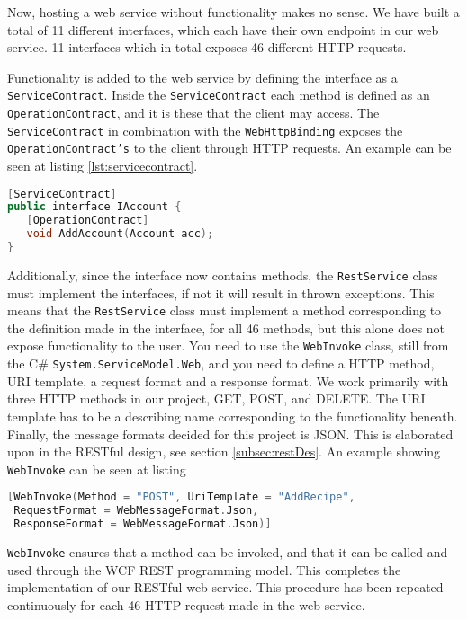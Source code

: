 Now, hosting a web service without functionality makes no sense. We have built a total of 11 different interfaces, which each have their own endpoint in our web service. 11 interfaces which in total exposes 46 different HTTP requests. 

Functionality is added to the web service by defining the interface as a \texttt{ServiceContract}. Inside the \texttt{ServiceContract} each method is defined as an \texttt{OperationContract}, and it is these that the client may access. The \texttt{ServiceContract} in combination with the \texttt{WebHttpBinding} exposes the \texttt{OperationContract's} to the client through HTTP requests. An example can be seen at listing \ref{lst:servicecontract}.

\begin{lstlisting}[language=c++, label={lst:servicecontract}, caption=Definition of a ServiceContract]
[ServiceContract]
public interface IAccount {
   [OperationContract]
   void AddAccount(Account acc);
}
\end{lstlisting}

Additionally, since the interface now contains methods, the \texttt{RestService} class must implement the interfaces, if not it will result in thrown exceptions. This means that the \texttt{RestService} class must implement a method corresponding to the definition made in the interface, for all 46 methods, but this alone does not expose functionality to the user. You need to use the \texttt{WebInvoke} class, still from the C\# \texttt{System.ServiceModel.Web}, and you need to define a HTTP method, URI template, a request format and a response format. We work primarily with three HTTP methods in our project, GET, POST, and DELETE. The URI template has to be a describing name corresponding to the functionality beneath. Finally, the message formats decided for this project is JSON. This is elaborated upon in the RESTful design, see section \ref{subsec:restDes}. An example showing \texttt{WebInvoke} can be seen at listing 

\begin{lstlisting}[language=c++, label={lst:webinvoke}, caption=Definition of a WebInvoke]
[WebInvoke(Method = "POST", UriTemplate = "AddRecipe", 
 RequestFormat = WebMessageFormat.Json, 
 ResponseFormat = WebMessageFormat.Json)]
\end{lstlisting}

\texttt{WebInvoke} ensures that a method can be invoked, and that it can be called and used through the WCF REST programming model. This completes the implementation of our RESTful web service. This procedure has been repeated continuously for each 46 HTTP request made in the web service.